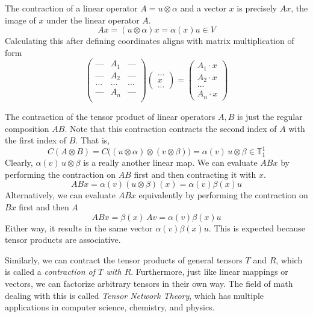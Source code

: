 \documentclass{article}
\begin{document}
    \begin{proposition}
    The contraction of a linear operator $A = u \otimes \alpha$ and a vector $x$ is precisely $A x$, the image of $x$ under the linear operator $A$. 
    \[A x = (u \otimes \alpha) x = \alpha (x) u \in V\]
    Calculating this after defining coordinates aligns with matrix multiplication of form
    \[\begin{pmatrix}
    \text{---} & A_1 & \text{---} \\
    \text{---} & A_2 & \text{---} \\
    ... & ... & ... \\
    \text{---} & A_n & \text{---} \\
    \end{pmatrix} \begin{pmatrix}
    ... \\ x \\ ... 
    \end{pmatrix} = \begin{pmatrix}
     A_1 \cdot x \\ A_2 \cdot x \\ ... \\ A_n \cdot x
    \end{pmatrix}\]
    \end{proposition}

    \begin{proposition}
    The contraction of the tensor product of linear operators $A, B$ is just the regular composition $A B$. Note that this contraction contracts the second index of $A$ with the first index of $B$. That is, 
    \[C(A \otimes B) = C\big( (u \otimes \alpha) \otimes (v \otimes \beta) \big) = \alpha(v) \, u \otimes \beta \in \mathbb{T}^1_1\]
    Clearly, $\alpha(v) \, u \otimes \beta$ is a really another linear map. We can evaluate $A B x$ by performing the contraction on $A B$ first and then contracting it with $x$. 
    \[A B x = \alpha (v) (u \otimes \beta) (x) = \alpha (v) \beta(x) u \]
    Alternatively, we can evaluate $A B x$ equivalently by performing the contraction on $B x$ first and then $A$ 
    \[A B x = \beta (x)\, A v = \alpha(v) \beta(x) u\]
    Either way, it results in the same vector $\alpha (v) \beta (x) u$. This is expected because tensor products are associative. 
    \end{proposition}

    Similarly, we can contract the tensor products of general tensors $T$ and $R$, which is called a \textit{contraction of $T$ with $R$}. Furthermore, just like linear mappings or vectors, we can factorize arbitrary tensors in their own way. The field of math dealing with this is called \textit{Tensor Network Theory}, which has multiple applications in computer science, chemistry, and physics. 
\end{document}
